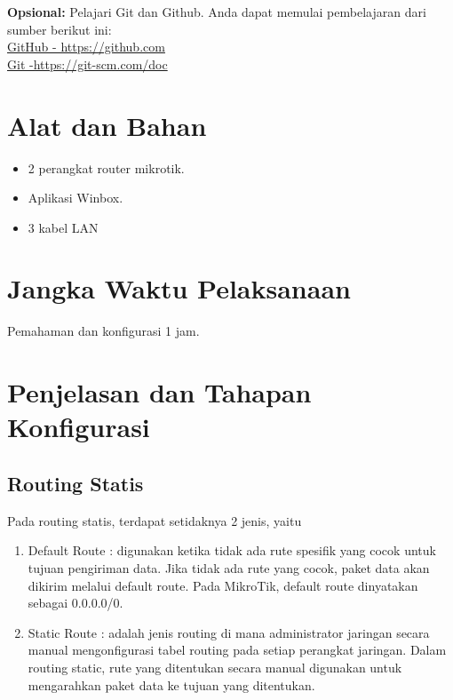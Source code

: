 \begin{center}
	\colorbox{cyan!30}{\parbox{0.8\linewidth}{\textbf{Opsional:} Pelajari Git dan Github. Anda dapat memulai pembelajaran dari sumber berikut ini: \\ \href{https://github.com}{GitHub - https://github.com} \\ \href{https://git-scm.com/doc}{Git -https://git-scm.com/doc}}}
\end{center}

\section{Alat dan Bahan}
\begin{itemize}[label=$\bullet$, itemsep=-1pt, leftmargin=*]
	\item 2 perangkat router mikrotik.
	\item Aplikasi Winbox.
	\item 3 kabel LAN
\end{itemize}

\section{Jangka Waktu Pelaksanaan}
Pemahaman dan konfigurasi 1 jam.

\section{Penjelasan dan Tahapan Konfigurasi}

\subsection{Routing Statis}
Pada routing statis, terdapat setidaknya 2 jenis, yaitu
\begin{enumerate}
	\item Default Route : digunakan ketika tidak ada rute spesifik yang cocok untuk tujuan pengiriman data. Jika tidak ada rute yang cocok, paket data akan dikirim melalui default route. Pada MikroTik, default route dinyatakan sebagai 0.0.0.0/0.
	\item Static Route : adalah jenis routing di mana administrator jaringan secara manual mengonfigurasi tabel routing pada setiap perangkat jaringan. Dalam routing static, rute yang ditentukan secara manual digunakan untuk mengarahkan paket data ke tujuan yang ditentukan.
\end{enumerate}

